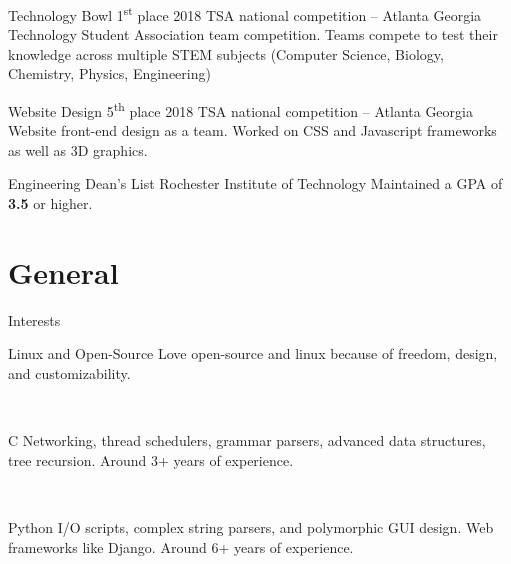 \documentclass[]{alternate}
\begin{document}
\begin{entrylist}
\entry
{}
{Technology Bowl 1\textsuperscript{st} place}
{2018 TSA national competition -- Atlanta Georgia}
{Technology Student Association team competition. Teams compete to test their knowledge across multiple STEM subjects (Computer Science, Biology, Chemistry, Physics, Engineering)}

\end{entrylist}
\begin{entrylist}

\entry
{}
{Website Design 5\textsuperscript{th} place}
{2018 TSA national competition -- Atlanta Georgia}
{Website front-end design as a team. Worked on CSS and Javascript frameworks as well as 3D graphics.}


\end{entrylist}
\begin{entrylist}

\entry
{}
{Engineering Dean's List}
{Rochester Institute of Technology}
{Maintained a GPA of \textbf{3.5} or higher.}

\end{entrylist}


\section{General}{Interests}

\vspace{-0.3cm}
\begin{entrylist}
\entry
{}
{Linux and Open-Source}
{}
{Love open-source and linux because of freedom, design, and customizability.}

\end{entrylist}\
\begin{entrylist}
\entry
{}
{C}
{}
{Networking, thread schedulers, grammar parsers, advanced data structures, tree recursion. Around 3+ years of experience.}
\end{entrylist}\
\begin{entrylist}
\entry
{}
{Python}
{}
{I/O scripts, complex string parsers, and polymorphic GUI design. Web frameworks like Django. Around 6+ years of experience.}

\end{entrylist}\
\end{document}
